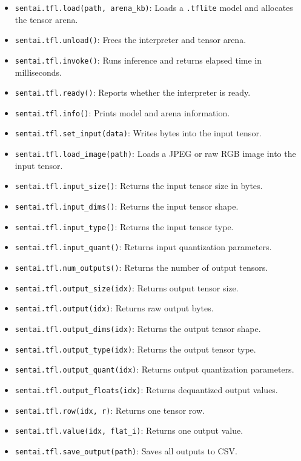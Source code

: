 \begin{itemize}
\tightlist
\item
  \texttt{sentai.tfl.load(path,\ arena\_kb)}: Loads a \texttt{.tflite}
  model and allocates the tensor arena.
\item
  \texttt{sentai.tfl.unload()}: Frees the interpreter and tensor arena.
\item
  \texttt{sentai.tfl.invoke()}: Runs inference and returns elapsed time
  in milliseconds.
\item
  \texttt{sentai.tfl.ready()}: Reports whether the interpreter is ready.
\item
  \texttt{sentai.tfl.info()}: Prints model and arena information.
\item
  \texttt{sentai.tfl.set\_input(data)}: Writes bytes into the input
  tensor.
\item
  \texttt{sentai.tfl.load\_image(path)}: Loads a JPEG or raw RGB image
  into the input tensor.
\item
  \texttt{sentai.tfl.input\_size()}: Returns the input tensor size in
  bytes.
\item
  \texttt{sentai.tfl.input\_dims()}: Returns the input tensor shape.
\item
  \texttt{sentai.tfl.input\_type()}: Returns the input tensor type.
\item
  \texttt{sentai.tfl.input\_quant()}: Returns input quantization
  parameters.
\item
  \texttt{sentai.tfl.num\_outputs()}: Returns the number of output
  tensors.
\item
  \texttt{sentai.tfl.output\_size(idx)}: Returns output tensor size.
\item
  \texttt{sentai.tfl.output(idx)}: Returns raw output bytes.
\item
  \texttt{sentai.tfl.output\_dims(idx)}: Returns the output tensor
  shape.
\item
  \texttt{sentai.tfl.output\_type(idx)}: Returns the output tensor type.
\item
  \texttt{sentai.tfl.output\_quant(idx)}: Returns output quantization
  parameters.
\item
  \texttt{sentai.tfl.output\_floats(idx)}: Returns dequantized output
  values.
\item
  \texttt{sentai.tfl.row(idx,\ r)}: Returns one tensor row.
\item
  \texttt{sentai.tfl.value(idx,\ flat\_i)}: Returns one output value.
\item
  \texttt{sentai.tfl.save\_output(path)}: Saves all outputs to CSV.
\end{itemize}

